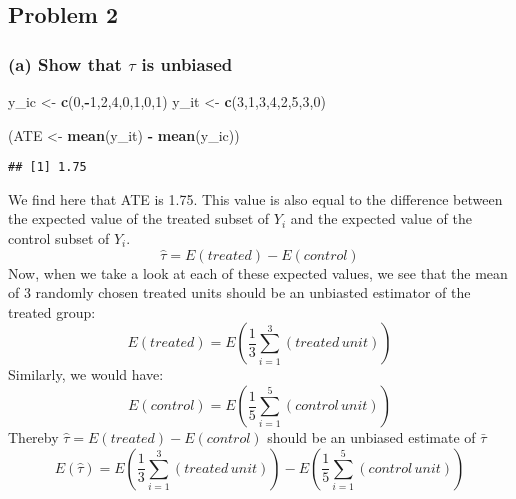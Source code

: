 \documentclass[]{article}
\newenvironment{Shaded}{\begin{snugshade}}{\end{snugshade}}
\newcommand{\DecValTok}[1]{\textcolor[rgb]{0.00,0.00,0.81}{#1}}
\newcommand{\KeywordTok}[1]{\textcolor[rgb]{0.13,0.29,0.53}{\textbf{#1}}}
\newcommand{\NormalTok}[1]{#1}
\newcommand{\OperatorTok}[1]{\textcolor[rgb]{0.81,0.36,0.00}{\textbf{#1}}}
\newcommand{\StringTok}[1]{\textcolor[rgb]{0.31,0.60,0.02}{#1}}
\begin{document}
\hypertarget{problem-2}{%
\subsection{Problem 2}\label{problem-2}}

\hypertarget{a-show-that-tau-is-unbiased}{%
\subsubsection{\texorpdfstring{(a) Show that \(\tau\) is
unbiased}{(a) Show that \textbackslash{}tau is unbiased}}\label{a-show-that-tau-is-unbiased}}

\begin{Shaded}
\begin{Highlighting}[]
\NormalTok{y_ic <-}\StringTok{ }\KeywordTok{c}\NormalTok{(}\DecValTok{0}\NormalTok{,}\OperatorTok{-}\DecValTok{1}\NormalTok{,}\DecValTok{2}\NormalTok{,}\DecValTok{4}\NormalTok{,}\DecValTok{0}\NormalTok{,}\DecValTok{1}\NormalTok{,}\DecValTok{0}\NormalTok{,}\DecValTok{1}\NormalTok{)}
\NormalTok{y_it <-}\StringTok{ }\KeywordTok{c}\NormalTok{(}\DecValTok{3}\NormalTok{,}\DecValTok{1}\NormalTok{,}\DecValTok{3}\NormalTok{,}\DecValTok{4}\NormalTok{,}\DecValTok{2}\NormalTok{,}\DecValTok{5}\NormalTok{,}\DecValTok{3}\NormalTok{,}\DecValTok{0}\NormalTok{)}

\NormalTok{(ATE <-}\StringTok{ }\KeywordTok{mean}\NormalTok{(y_it) }\OperatorTok{-}\StringTok{ }\KeywordTok{mean}\NormalTok{(y_ic))}
\end{Highlighting}
\end{Shaded}

\begin{verbatim}
## [1] 1.75
\end{verbatim}

We find here that ATE is 1.75. This value is also equal to the
difference between the expected value of the treated subset of \(Y_i\)
and the expected value of the control subset of \(Y_i\).
\[\hat{\tau} = E(treated) - E(control)\] Now, when we take a look at
each of these expected values, we see that the mean of 3 randomly chosen
treated units should be an unbiasted estimator of the treated group:
\[E(treated) = E(\frac13 \sum_{i=1}^{3} (treated\,unit))\] Similarly, we
would have: \[E(control) = E(\frac15 \sum_{i=1}^5 (control \, unit))\]
Thereby \(\hat{\tau} = E(treated) - E(control)\) should be an unbiased
estimate of \(\bar{\tau}\)
\[E(\hat{\tau}) = E(\frac13 \sum_{i=1}^{3} (treated\,unit)) - E(\frac15 \sum_{i=1}^5 (control \, unit))\]
\end{document}
